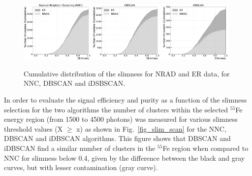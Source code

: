\documentclass[a4paper,11pt]{article}
\begin{document}
\begin{figure}[ht]
\centering
\includegraphics[width=0.32\textwidth]{CDF_Slimness_2D.pdf}
\includegraphics[width=0.32\textwidth]{CDF_Slimness_1D.pdf}
\includegraphics[width=0.32\textwidth]{CDF_Slimness_3D.pdf}
\caption{Cumulative distribution of the slimness for NRAD and ER data, for NNC, DBSCAN and iDSBSCAN.} 
\label{fig_cdf_slim}
\end{figure}


In order to evaluate the signal efficiency and purity as a function of the slimness selection for the two algorithms
the number of clusters within the selected $^{55}$Fe energy region (from 1500 to 4500 photons) was measured for various slimness threshold values (X $\geqslant$ x) as shown in Fig.~\ref{fig_slim_scan} for the NNC, DBSCAN and iDBSCAN algorithms.
This figure shows that DBSCAN and iDBSCAN find a similar number of clusters in the $^{55}$Fe region when compared to NNC for slimness below 0.4, given by the difference between the black and gray curves, but with lesser contamination (gray curve).
\end{document}

